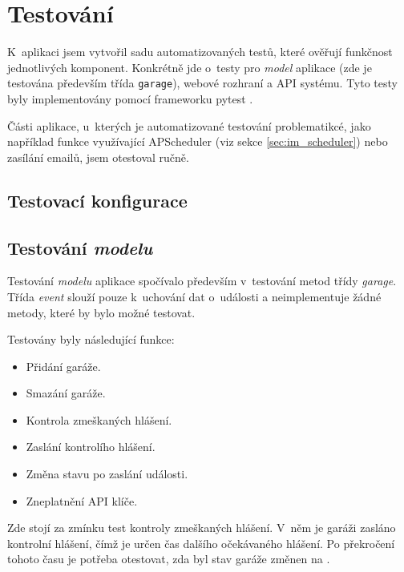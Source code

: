 \chapter{Testování}
\label{sec:te}

K~aplikaci jsem vytvořil sadu automatizovaných testů, které ověřují funkčnost jednotlivých komponent. Konkrétně jde o~testy pro \textit{model} aplikace (zde je testována především třída \texttt{garage}), webové rozhraní a API systému. Tyto testy byly implementovány pomocí frameworku pytest \cite{pytest}.

Části aplikace, u~kterých je automatizované testování problematikcé, jako například funkce využívající APScheduler (viz sekce \ref{sec:im_scheduler}) nebo zasílání emailů, jsem otestoval ručně.

\section{Testovací konfigurace}


\section{Testování \textit{modelu}}

Testování \textit{modelu} aplikace spočívalo především v~testování metod třídy \textit{garage}. Třída \textit{event} slouží pouze k~uchování dat o~události a neimplementuje žádné metody, které by bylo možné testovat.

Testovány byly následující funkce:

\begin{itemize}
    \item Přidání garáže.
    \item Smazání garáže.
    \item Kontrola zmeškaných hlášení.
    \item Zaslání kontrolího hlášení.
    \item Změna stavu po zaslání události.
    \item Zneplatnění API klíče.
\end{itemize}

Zde stojí za zmínku test kontroly zmeškaných hlášení. V~něm je garáži zasláno kontrolní hlášení, čímž je určen čas dalšího očekávaného hlášení. Po překročení tohoto času je potřeba otestovat, zda byl stav garáže změnen na .

